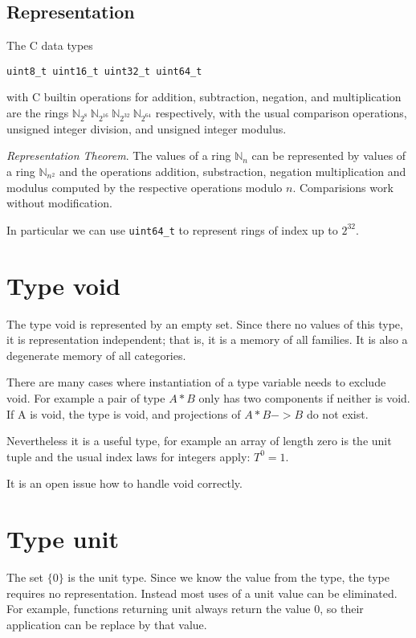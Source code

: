 \subsection{Representation}
\begin{lemma} The C data types
\begin{verbatim}
uint8_t uint16_t uint32_t uint64_t
\end{verbatim}
with C builtin operations for addition, subtraction, negation, and multiplication
are the rings
\(\mathbb{N}_{2^8}\ \mathbb{N}_{2^{16}}\ \mathbb{N}_{2^{32}}\ \mathbb{N}_{2^{64}} \)
respectively, with the usual comparison operations, unsigned integer division,
and unsigned integer modulus.
\end{lemma}

\begin{theorem}
{\em Representation Theorem}. The values of a ring $\mathbb{N}_n$ can be represented
by values of a ring $\mathbb{N}_{n^2}$ and the operations addition, substraction, negation
multiplication and modulus computed by the respective operations modulo $n$. Comparisions
work without modification.
\end{theorem}
In particular we can use \verb$uint64_t$ to represent rings of index up to 
$2^{32}$.

\section{Type void}
The type void is represented by an empty set. Since there no values
of this type, it is representation independent; that is, it is a memory
of all families. It is also a degenerate memory of all categories.

There are many cases where instantiation of a type variable needs to exclude void.
For example a pair of type $A * B$ only has two components if neither is void.
If A is void, the type is void, and projections of $A * B -> B$ do not exist.

Nevertheless it is a useful type, for example an array of length zero is the
unit tuple and the usual index laws for integers apply: $T^0 = 1$.

It is an open issue how to handle void correctly.

\section{Type unit}
The set $\{0\}$ is the unit type. Since we know the value from the type,
the type requires no representation. Instead most uses of a unit value
can be eliminated. For example, functions returning unit always return
the value 0, so their application can be replace by that value.

